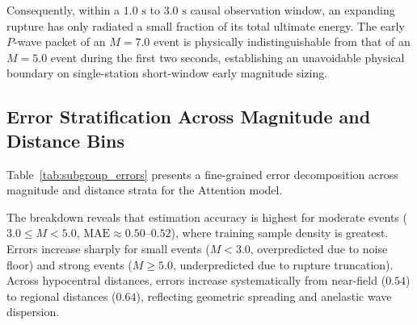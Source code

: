 \documentclass[journal]{IEEEtran}
\begin{document}
Consequently, within a $1.0\text{ s}$ to $3.0\text{ s}$ causal observation window, an expanding rupture has only radiated a small fraction of its total ultimate energy. The early $P$-wave packet of an $M = 7.0$ event is physically indistinguishable from that of an $M = 5.0$ event during the first two seconds, establishing an unavoidable physical boundary on single-station short-window early magnitude sizing.

\subsection{Error Stratification Across Magnitude and Distance Bins}
Table~\ref{tab:subgroup_errors} presents a fine-grained error decomposition across magnitude and distance strata for the Attention model.

\begin{table}[t]
\caption{Attention Model Magnitude Estimation Error Decomposition ($3.0\text{ s}$ Horizon)}
\label{tab:subgroup_errors}
\centering
\footnotesize
{}
\end{table}

The breakdown reveals that estimation accuracy is highest for moderate events ($3.0 \le M < 5.0$, $\text{MAE} \approx 0.50$--$0.52$), where training sample density is greatest. Errors increase sharply for small events ($M < 3.0$, overpredicted due to noise floor) and strong events ($M \ge 5.0$, underpredicted due to rupture truncation). Across hypocentral distances, errors increase systematically from near-field ($0.54$) to regional distances ($0.64$), reflecting geometric spreading and anelastic wave dispersion.
\end{document}

